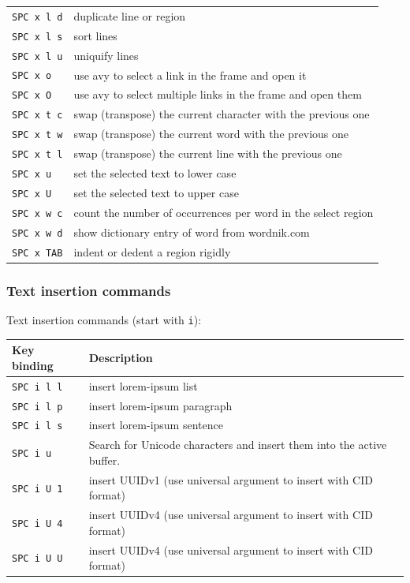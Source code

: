 \documentclass[11pt]{article}
\begin{document}
\begin{center}
\begin{tabular}{ll}
\texttt{SPC x l d} & duplicate line or region\\
\texttt{SPC x l s} & sort lines\\
\texttt{SPC x l u} & uniquify lines\\
\texttt{SPC x o} & use avy to select a link in the frame and open it\\
\texttt{SPC x O} & use avy to select multiple links in the frame and open them\\
\texttt{SPC x t c} & swap (transpose) the current character with the previous one\\
\texttt{SPC x t w} & swap (transpose) the current word with the previous one\\
\texttt{SPC x t l} & swap (transpose) the current line with the previous one\\
\texttt{SPC x u} & set the selected text to lower case\\
\texttt{SPC x U} & set the selected text to upper case\\
\texttt{SPC x w c} & count the number of occurrences per word in the select region\\
\texttt{SPC x w d} & show dictionary entry of word from wordnik.com\\
\texttt{SPC x TAB} & indent or dedent a region rigidly\\
\end{tabular}
\end{center}

\subsubsection{Text insertion commands}
\label{sec:org46ec810}
Text insertion commands (start with \texttt{i}):

\begin{center}
\begin{tabular}{ll}
Key binding & Description\\
\hline
\texttt{SPC i l l} & insert lorem-ipsum list\\
\texttt{SPC i l p} & insert lorem-ipsum paragraph\\
\texttt{SPC i l s} & insert lorem-ipsum sentence\\
\texttt{SPC i u} & Search for Unicode characters and insert them into the active buffer.\\
\texttt{SPC i U 1} & insert UUIDv1 (use universal argument to insert with CID format)\\
\texttt{SPC i U 4} & insert UUIDv4 (use universal argument to insert with CID format)\\
\texttt{SPC i U U} & insert UUIDv4 (use universal argument to insert with CID format)\\
\end{tabular}
\end{center}
\end{document}
